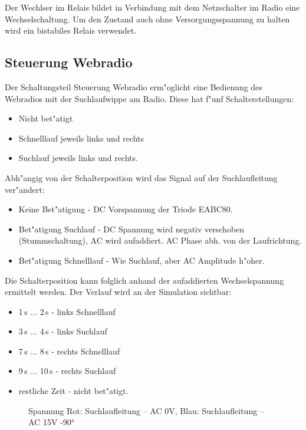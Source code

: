 \documentclass[ngerman,11pt,parskip=half] {scrartcl}
\begin{document}
Der Wechlser im Relais bildet in Verbindung mit dem Netzschalter im Radio eine Wechselschaltung. Um den Zustand auch ohne Versorgungsspannung zu halten wird ein bistabiles Relais verwendet.

\subsection{Steuerung Webradio} \label{sec:schaltung:steuern-web}

Der Schaltungsteil Steuerung Webradio erm"oglicht eine Bedienung des Webradios mit der Suchlaufwippe am Radio. Diese hat f"unf Schalterstellungen:
\begin{itemize}
\item Nicht bet"atigt
\item Schnelllauf jeweils links und rechts
\item Suchlauf jeweils links und rechts.
\end{itemize}
Abh"angig von der Schalterposition wird das Signal auf der Suchlaufleitung ver"andert:
\begin{itemize}
\item Keine Bet"atigung - DC Vorspannung der Triode EABC80.
\item Bet"atigung Suchlauf - DC Spannung wird negativ verschoben (Stummschaltung), AC wird aufaddiert. AC Phase abh. von der Laufrichtung.
\item Bet"atigung Schnelllauf - Wie Suchlauf, aber AC Amplitude h"oher.
\end{itemize}

Die Schalterposition kann folglich anhand der aufaddierten Wechselspannung ermittelt werden. Der Verlauf wird an der Simulation sichtbar:

\begin{itemize}
\item 1\,s ... 2\,s - links Schnelllauf
\item 3\,s ... 4\,s - links Suchlauf
\item 7\,s ... 8\,s - rechts Schnelllauf
\item 9\,s ... 10\,s - rechts Suchlauf
\item restliche Zeit - nicht bet"atigt.
\end{itemize}

\begin{figure}[H]
\centering
{}
\caption{Spannung Rot: Suchlaufleitung -- AC 0V, Blau: Suchlaufleitung -- AC 15V -90°} \label{fig:1}
\end{figure}
\end{document}
